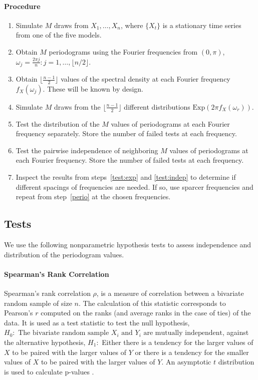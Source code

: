 \documentclass{article}\usepackage{graphicx, color}
\theoremstyle{plain}
\begin{document}
\paragraph{Procedure}
\begin{enumerate}
\item Simulate $M$ draws from $X_1,\dots, X_n$, where $\{X_t\}$ is a stationary time series from one of the five models.
\item \label{perio}Obtain $M$ periodograms using the Fourier frequencies from $(0, \pi)$, $\omega_j = \frac{2\pi j}{n}: j = 1, \dots, \lfloor n/2 \rfloor$.
\item Obtain $\lfloor\frac{n-1}{2}\rfloor$ values of the spectral density at each Fourier frequency $f_X(\omega_j)$. These will be known by design.
\item Simulate $M$ draws from the $\lfloor\frac{n-1}{2}\rfloor$ different distributions $\text{Exp}(2\pi f_X(\omega_r))$.
\item \label{test:exp}Test the distribution of the $M$ values of periodograms at each Fourier frequency separately. Store the number of failed tests at each frequency.
\item \label{test:indep}Test the pairwise independence of neighboring $M$ values of periodograms at each Fourier frequency. Store the number of failed tests at each frequency.
\item Inspect the results from steps~\ref{test:exp} and \ref{test:indep} to determine if different spacings of frequencies are needed. If so, use sparcer frequencies and repeat from step~\ref{perio} at the chosen frequencies.
\end{enumerate}


\subsection{Tests}

We use the following nonparametric hypothesis tests to assess independence and distribution of the periodogram values.

\paragraph{Spearman's Rank Correlation}
Spearman's rank correlation $\rho$, is a measure of correlation between a bivariate random sample of size $n$. The calculation of this statistic corresponds to Pearson's $r$ computed on the ranks (and average ranks in the case of ties) of the data. It is used as a test statistic to test the null hypothesis, $H_0: \text{ The bivariate random sample } X_i \text{ and } Y_i \text{ are mutually independent}$, against the alternative hypothesis, $H_1:$ Either there is a tendency for the larger values of $X$ to be paired with the larger values of $Y$ or there is a tendency for the smaller values of $X$ to be paired with the larger values of $Y$. An asymptotic $t$ distribution is used to calculate p-values \cite{conover1998practical}.
\end{document}
